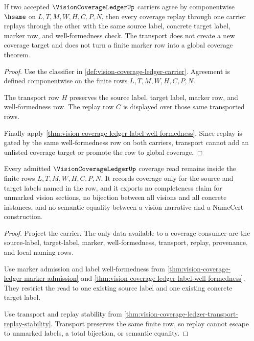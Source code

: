 \begin{theorem}
\label{thm:vision-coverage-ledger-transport-replay-stability}
If two accepted $\VisionCoverageLedgerUp$ carriers agree by componentwise $\hsame$ on $L,T,M,W,H,C,P,N$, then every coverage replay through one carrier replays through the other with the same source label, concrete target label, marker row, and well-formedness check. The transport does not create a new coverage target and does not turn a finite marker row into a global coverage theorem.
\end{theorem}
\begin{proof}
Use the classifier in \autoref{def:vision-coverage-ledger-carrier}. Agreement is defined componentwise on the finite rows $L,T,M,W,H,C,P,N$.

The transport row $H$ preserves the source label, target label, marker row, and well-formedness row. The replay row $C$ is displayed over those same transported rows.

Finally apply \autoref{thm:vision-coverage-ledger-label-well-formedness}. Since replay is gated by the same well-formedness row on both carriers, transport cannot add an unlisted coverage target or promote the row to global coverage.
\end{proof}

\begin{theorem}
\label{thm:vision-coverage-ledger-finite-row-non-escape}
Every admitted $\VisionCoverageLedgerUp$ coverage read remains inside the finite rows $L,T,M,W,H,C,P,N$. It records coverage only for the source and target labels named in the row, and it exports no completeness claim for unmarked vision sections, no bijection between all visions and all concrete instances, and no semantic equality between a vision narrative and a NameCert construction.
\end{theorem}
\begin{proof}
Project the carrier. The only data available to a coverage consumer are the source-label, target-label, marker, well-formedness, transport, replay, provenance, and local naming rows.

Use marker admission and label well-formedness from \autoref{thm:vision-coverage-ledger-marker-admission} and \autoref{thm:vision-coverage-ledger-label-well-formedness}. They restrict the read to one existing source label and one existing concrete target label.

Use transport and replay stability from \autoref{thm:vision-coverage-ledger-transport-replay-stability}. Transport preserves the same finite row, so replay cannot escape to unmarked labels, a total bijection, or semantic equality.
\end{proof}


